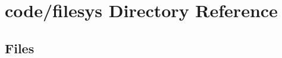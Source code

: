 \section{code/filesys Directory Reference}
\label{dir_8e72e263aa613966cfdc557bf0a05642}
\subsection*{Files}
\begin{DoxyCompactItemize}
\end{DoxyCompactItemize}
